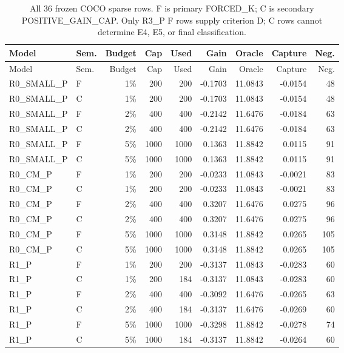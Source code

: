 {\small
\setlength{\tabcolsep}{3pt}
\begin{longtable}{llrrrrrrr}
\caption{All 36 frozen COCO sparse rows. F is primary FORCED\_K; C is secondary POSITIVE\_GAIN\_CAP. Only R3\_P F rows supply criterion D; C rows cannot determine E4, E5, or final classification.}\label{tab:coco-sparse}\\
\toprule
Model & Sem. & Budget & Cap & Used & Gain & Oracle & Capture & Neg. \\
\midrule
\endfirsthead
\toprule
Model & Sem. & Budget & Cap & Used & Gain & Oracle & Capture & Neg. \\
\midrule
\endhead
R0\_SMALL\_P & F & 1\% & 200 & 200 & -0.1703 & 11.0843 & -0.0154 & 48 \\
R0\_SMALL\_P & C & 1\% & 200 & 200 & -0.1703 & 11.0843 & -0.0154 & 48 \\
R0\_SMALL\_P & F & 2\% & 400 & 400 & -0.2142 & 11.6476 & -0.0184 & 63 \\
R0\_SMALL\_P & C & 2\% & 400 & 400 & -0.2142 & 11.6476 & -0.0184 & 63 \\
R0\_SMALL\_P & F & 5\% & 1000 & 1000 & 0.1363 & 11.8842 & 0.0115 & 91 \\
R0\_SMALL\_P & C & 5\% & 1000 & 1000 & 0.1363 & 11.8842 & 0.0115 & 91 \\
R0\_CM\_P & F & 1\% & 200 & 200 & -0.0233 & 11.0843 & -0.0021 & 83 \\
R0\_CM\_P & C & 1\% & 200 & 200 & -0.0233 & 11.0843 & -0.0021 & 83 \\
R0\_CM\_P & F & 2\% & 400 & 400 & 0.3207 & 11.6476 & 0.0275 & 96 \\
R0\_CM\_P & C & 2\% & 400 & 400 & 0.3207 & 11.6476 & 0.0275 & 96 \\
R0\_CM\_P & F & 5\% & 1000 & 1000 & 0.3148 & 11.8842 & 0.0265 & 105 \\
R0\_CM\_P & C & 5\% & 1000 & 1000 & 0.3148 & 11.8842 & 0.0265 & 105 \\
R1\_P & F & 1\% & 200 & 200 & -0.3137 & 11.0843 & -0.0283 & 60 \\
R1\_P & C & 1\% & 200 & 184 & -0.3137 & 11.0843 & -0.0283 & 60 \\
R1\_P & F & 2\% & 400 & 400 & -0.3092 & 11.6476 & -0.0265 & 63 \\
R1\_P & C & 2\% & 400 & 184 & -0.3137 & 11.6476 & -0.0269 & 60 \\
R1\_P & F & 5\% & 1000 & 1000 & -0.3298 & 11.8842 & -0.0278 & 74 \\
R1\_P & C & 5\% & 1000 & 184 & -0.3137 & 11.8842 & -0.0264 & 60 \\

\end{longtable}}
